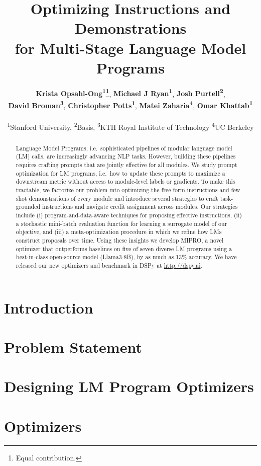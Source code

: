 \documentclass[11pt]{article}
\title{Optimizing Instructions and Demonstrations \\for Multi-Stage Language Model Programs}
\author{
 \textbf{Krista Opsahl-Ong\textsuperscript{1}\thanks{Equal contribution.}},\hspace{1mm}
 \textbf{Michael J Ryan\textsuperscript{1}\footnotemark[1]},\hspace{1mm}
 \textbf{Josh Purtell\textsuperscript{2}},\hspace{1mm}
\\
 \textbf{David Broman\textsuperscript{3}},\hspace{1mm}
 \textbf{Christopher Potts\textsuperscript{1}},\hspace{1mm}
 \textbf{Matei Zaharia\textsuperscript{4}},\hspace{1mm}
 \textbf{Omar Khattab\textsuperscript{1}}
\\
\\
 \textsuperscript{1}Stanford University,
 \textsuperscript{2}Basis,
 \textsuperscript{3}KTH Royal Institute of Technology
 \textsuperscript{4}UC Berkeley
}
\begin{document}
\maketitle
\begin{abstract}
Language Model Programs, i.e.\ sophisticated pipelines of modular language model (LM) calls, are increasingly advancing NLP tasks. However, building these pipelines requires crafting prompts that are jointly effective for all modules. We study prompt optimization for LM programs, i.e.\ how to update these prompts to maximize a downstream metric without access to module-level labels or gradients. To make this tractable, we factorize our problem into optimizing the free-form instructions and few-shot demonstrations of every module and introduce several strategies to craft task-grounded instructions and navigate credit assignment across modules. Our strategies include (i) program-and-data-aware techniques for proposing effective instructions, (ii) a stochastic mini-batch evaluation function for learning a surrogate model of our objective, and (iii) a meta-optimization procedure in which we refine how LMs construct proposals over time. Using these insights we develop MIPRO, a novel optimizer that outperforms baselines on five of seven diverse LM programs using a best-in-class open-source model (Llama3-8B), by as much as 13\% accuracy. We have released our new optimizers and benchmark in DSPy at \url{http://dspy.ai}.




\end{abstract}

\section{Introduction}


\section{Problem Statement}


\section{Designing LM Program Optimizers}
\label{sec:design}


\section{Optimizers}

\end{document}
